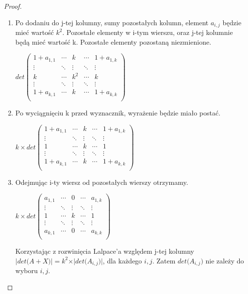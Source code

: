 \begin{proof}
\begin{enumerate}
\item Po dodaniu do j-tej kolumny, sumy pozostałych kolumn, element $a_{i,j}$ będzie mieć wartość $k^2$. Pozostałe elementy w i-tym wierszu, oraz j-tej kolumnie będą mieć wartość k. Pozostałe elementy pozostaną niezmienione. \\
\begin{center}
$det \begin{pmatrix}
 1+a_{1,1} & \cdots & k & \cdots &  1+a_{1,k} \\
 \vdots & \ddots & \vdots & \ddots & \vdots \\
  k & \cdots & k^2 & \cdots & k \\ 
 \vdots & \ddots & \vdots & \ddots & \vdots \\
 1+a_{k,1} & \cdots & k & \cdots &  1+a_{k,k} \\
\end{pmatrix}$ \\
\end{center}

\item Po wyciągnięciu k przed wyznacznik, wyrażenie będzie miało postać. \\
\begin{center}
$k \times det \begin{pmatrix}
 1+a_{1,1} & \cdots & k & \cdots &  1+a_{1,k} \\
 \vdots & \ddots & \vdots & \ddots & \vdots \\
  1 & \cdots & k & \cdots & 1 \\ 
 \vdots & \ddots & \vdots & \ddots & \vdots \\
 1+a_{k,1} & \cdots & k & \cdots &  1+a_{k,k} \\
\end{pmatrix}$ \\
\end{center}
\item Odejmując i-ty wiersz od pozostałych wierszy otrzymamy. 
\begin{center}
$k \times det \begin{pmatrix}
 a_{1,1} & \cdots & 0 & \cdots &  a_{1,k} \\
 \vdots & \ddots & \vdots & \ddots & \vdots \\
  1 & \cdots & k & \cdots & 1 \\ 
 \vdots & \ddots & \vdots & \ddots & \vdots \\
 a_{k,1} & \cdots & 0 & \cdots &  a_{k,k} \\
\end{pmatrix}$ \\
\end{center}

Korzystając z rozwinięcia Lalpace'a względem j-tej kolumny $\vert det  \big(A+X \big) \vert = k^2 \times \vert det \big( A_{i,j} \big) \vert$, dla każdego $i, j$. Zatem $det \big( A_{i,j} \big)$ nie zależy do wyboru $i, j$. 

\end{enumerate}


\end{proof}



